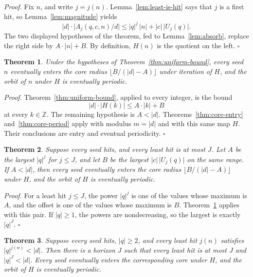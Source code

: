 \documentclass[11pt,letterpaper]{article}
\newcommand{\Z}{\mathbb{Z}}
\newtheorem{theorem}{Theorem}
\newenvironment{proof}{\noindent\textit{Proof.}}{\hfill\(\square\)}
\begin{document}
\begin{proof}
Fix \(n\), and write \(j=j(n)\). Lemma~\ref{lem:least-is-hit} says that \(j\) is a first hit, so Lemma~\ref{lem:magnitude} yields
\[
\lvert d\rvert\cdot\bigl\lvert A_j(q,c,n)/d\bigr\rvert
\le \lvert q\rvert^j\,\lvert n\rvert+\lvert c\rvert\,\lvert U_j(q)\rvert.
\]
The two displayed hypotheses of the theorem, fed to Lemma~\ref{lem:absorb}, replace the right side by \(A\cdot\lvert n\rvert+B\). By definition, \(H(n)\) is the quotient on the left.
\end{proof}

\begin{theorem}
\label{thm:uniform-periodic}
Under the hypotheses of Theorem~\ref{thm:uniform-bound}, every seed \(n\) eventually enters the core radius \(\lfloor B/(\lvert d\rvert-A)\rfloor\) under iteration of \(H\), and the orbit of \(n\) under \(H\) is eventually periodic.
\end{theorem}

\begin{proof}
Theorem~\ref{thm:uniform-bound}, applied to every integer, is the bound
\[
\lvert d\rvert\cdot\lvert H(k)\rvert\le A\cdot\lvert k\rvert+B
\]
at every \(k\in\Z\). The remaining hypothesis is \(A<\lvert d\rvert\). Theorems~\ref{thm:core-entry} and~\ref{thm:core-period} apply with modulus \(m=\lvert d\rvert\) and with this same map \(H\). Their conclusions are entry and eventual periodicity.
\end{proof}

\begin{theorem}
\label{thm:horizon}
Suppose every seed hits, and every least hit is at most \(J\). Let \(A\) be the largest \(\lvert q\rvert^{j}\) for \(j\le J\), and let \(B\) be the largest \(\lvert c\rvert\,\lvert U_j(q)\rvert\) on the same range. If \(A<\lvert d\rvert\), then every seed eventually enters the core radius \(\lfloor B/(\lvert d\rvert-A)\rfloor\) under \(H\), and the orbit of \(H\) is eventually periodic.
\end{theorem}

\begin{proof}
For a least hit \(j\le J\), the power \(\lvert q\rvert^{j}\) is one of the values whose maximum is \(A\), and the offset is one of the values whose maximum is \(B\). Theorem~\ref{thm:uniform-periodic} applies with this pair. If \(\lvert q\rvert\ge 1\), the powers are nondecreasing, so the largest is exactly \(\lvert q\rvert^{J}\).
\end{proof}

\begin{theorem}
\label{thm:smallslope}
Suppose every seed hits, \(\lvert q\rvert\ge 2\), and every least hit \(j(n)\) satisfies \(\lvert q\rvert^{j(n)}<\lvert d\rvert\). Then there is a horizon \(J\) such that every least hit is at most \(J\) and \(\lvert q\rvert^{J}<\lvert d\rvert\). Every seed eventually enters the corresponding core under \(H\), and the orbit of \(H\) is eventually periodic.
\end{theorem}
\end{document}
